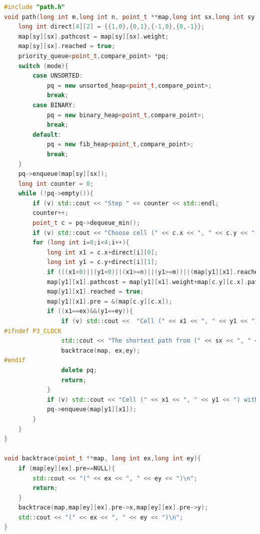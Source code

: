 \documentclass{article}
\begin{document}
\begin{lstlisting}[title=path.cpp,language=C++]
#include "path.h"
void path(long int m,long int n, point_t **map,long int sx,long int sy,long int ex,long int ey,Modes mode,bool v){
    long int direct[4][2] = {{1,0},{0,1},{-1,0},{0,-1}};
    map[sy][sx].pathcost = map[sy][sx].weight;
    map[sy][sx].reached = true;
    priority_queue<point_t,compare_point> *pq;
    switch (mode){
        case UNSORTED:
            pq = new unsorted_heap<point_t,compare_point>;
            break;
        case BINARY:
            pq = new binary_heap<point_t,compare_point>;
            break;
        default:
            pq = new fib_heap<point_t,compare_point>;
            break;            
    }
    pq->enqueue(map[sy][sx]);
    long int counter = 0;
    while (!pq->empty()){
        if (v) std::cout << "Step " << counter << std::endl;
        counter++;
        point_t c = pq->dequeue_min();
        if (v) std::cout << "Choose cell (" << c.x << ", " << c.y << ") with accumulated length " << c.pathcost << ".\n";
        for (long int i=0;i<4;i++){
            long int x1 = c.x+direct[i][0];
            long int y1 = c.y+direct[i][1];
            if (((x1<0)||(y1<0)||(x1>=n)||(y1>=m))||(map[y1][x1].reached)) continue;
            map[y1][x1].pathcost = map[y1][x1].weight+map[c.y][c.x].pathcost;
            map[y1][x1].reached = true;
            map[y1][x1].pre = &(map[c.y][c.x]);
            if ((x1==ex)&&(y1==ey)){
                if (v) std::cout <<  "Cell (" << x1 << ", " << y1 << ") with accumulated length " << map[y1][x1].pathcost << " is the ending point.\n";
#ifndef P3_CLOCK
                std::cout << "The shortest path from (" << sx << ", " << sy << ") to (" << ex << ", " << ey << ") is " << map[y1][x1].pathcost << ".\nPath:\n";
                backtrace(map, ex,ey);
#endif
                delete pq;
                return; 
            } 
            if (v) std::cout << "Cell (" << x1 << ", " << y1 << ") with accumulated length " << map[y1][x1].pathcost << " is added into the queue.\n";
            pq->enqueue(map[y1][x1]);
        }
    }
}

void backtrace(point_t **map, long int ex,long int ey){
    if (map[ey][ex].pre==NULL){
        std::cout << "(" << ex << ", " << ey << ")\n";
        return;
    }
    backtrace(map,map[ey][ex].pre->x,map[ey][ex].pre->y);
    std::cout << "(" << ex << ", " << ey << ")\n";
}

\end{lstlisting}
\end{document}
